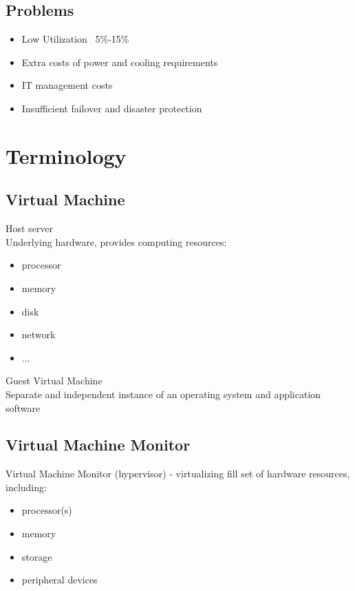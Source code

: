 \documentclass{beamer}
\begin{document}
\subsection{Problems}
\begin{frame}
\begin{itemize}
\item Low Utilization ~5\%-15\%
\pause
\item Extra costs of power and cooling requirements
\pause
\item IT management costs
\pause
\item Insufficient failover and disaster protection
\end{itemize}
\end{frame}

\section{Terminology}
\subsection{Virtual Machine}
\begin{frame}
Host server \\
Underlying hardware, provides computing resources:
\begin{itemize}
\item processor
\item memory
\item disk
\item network
\item ...
\end{itemize}
Guest Virtual Machine \\
Separate and independent instance of an operating system and application software
\end{frame}

\subsection{Virtual Machine Monitor}
\begin{frame}
Virtual Machine Monitor (hypervisor) - virtualizing fill set of hardware resources, including:
\begin{itemize}
\item processor(s)
\item memory
\item storage
\item peripheral devices
\end{itemize}
\end{frame}
\end{document}
